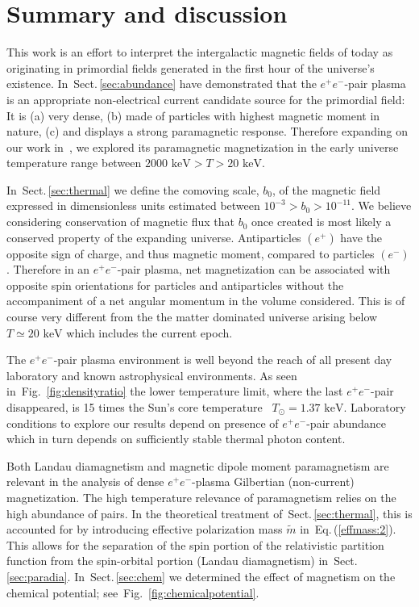 \documentclass[aps,prd,floatfix,reprint]{revtex4-2}
\newcommand*{\keV}{\text{ keV}}
\newcommand{\req}[1]{Eq.\,(\ref{#1})}
\newcommand{\rf}[1]{Fig.~{\ref{#1}}}
\newcommand{\rsec}[1]{Sect.\,{\ref{#1}}}
\begin{document}
\section{Summary and discussion}
\label{sec:conclusions}
\noindent This work is an effort to interpret the intergalactic magnetic fields of today as originating in primordial fields generated in the first hour of the universe's existence. In~\rsec{sec:abundance} have demonstrated that the $e^{+}e^{-}$-pair plasma is an appropriate non-electrical current candidate source for the primordial field: It is (a) very dense, (b) made of particles with highest magnetic moment in nature, (c) and displays a strong paramagnetic response. Therefore expanding on our work in~\cite{Rafelski:2023emw}, we explored its paramagnetic magnetization in the early universe temperature range between $2000\keV>T>20\keV$. 

In~\rsec{sec:thermal} we define the comoving scale, $b_{0}$, of the magnetic field expressed in dimensionless units estimated between $10^{-3}>b_{0}>10^{-11}$. We believe considering conservation of magnetic flux that $b_{0}$ once created is most likely a conserved property of the expanding universe. Antiparticles $(e^{+})$ have the opposite sign of charge, and thus magnetic moment, compared to particles $(e^{-})$. Therefore in an $e^{+}e^{-}$-pair plasma, net magnetization can be associated with opposite spin orientations for particles and antiparticles without the accompaniment of a net angular momentum in the volume considered. This is of course very different from the the matter dominated universe arising below $T\simeq 20\keV$ which includes the current epoch.

The $e^{+}e^{-}$-pair plasma environment is well beyond the reach of all present day laboratory and known astrophysical environments. As seen in~\rf{fig:densityratio} the lower temperature limit, where the last $e^{+}e^{-}$-pair disappeared, is 15 times the Sun's core temperature~\cite{Bahcall:2000nu} $T_{\odot}=1.37\keV$. Laboratory conditions to explore our results depend on presence of $e^{+}e^{-}$-pair abundance which in turn depends on sufficiently stable thermal photon content.

Both Landau diamagnetism and magnetic dipole moment paramagnetism are relevant in the analysis of dense $e^{+}e^{-}$-plasma Gilbertian (non-current) magnetization. The high temperature relevance of paramagnetism relies on the high abundance of pairs. In the theoretical treatment of~\rsec{sec:thermal}, this is accounted for by introducing effective polarization mass $\tilde{m}$ in~\req{effmass:2}. This allows for the separation of the spin portion of the relativistic partition function from the spin-orbital portion (Landau diamagnetism) in~\rsec{sec:paradia}. In~\rsec{sec:chem} we determined the effect of magnetism on the chemical potential; 
see~\rf{fig:chemicalpotential}.
\end{document}
